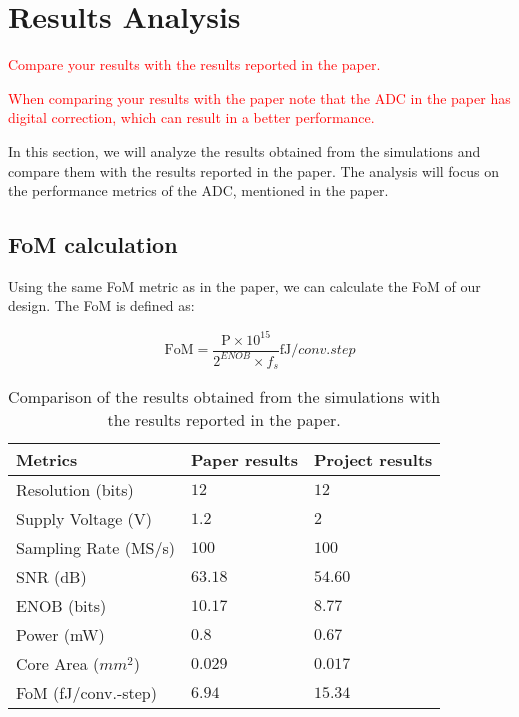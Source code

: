 \section{Results Analysis}
\label{sec:results}
\textcolor{red}{Compare your results with the results reported in the paper.}

\textcolor{red}{When comparing your results with the paper note that the ADC in the paper has digital correction, which can result in a better performance.}

In this section, we will analyze the results obtained from the simulations and compare them with the results reported in the paper. The analysis will focus on the performance metrics of the ADC, mentioned in the paper.

\subsection{FoM calculation}

Using the same FoM metric as in the paper, we can calculate the FoM of our design. The FoM is defined as:

\begin{equation}
    \text{FoM} = \frac{\text{P} \times 10^{15}}{2^{ENOB} \times f_s } \si{\femto \joule \per conv.step}
    \label{eq:FoM}
\end{equation}

\begin{table}[h]
    \centering
    \caption{Comparison of the results obtained from the simulations with the results reported in the paper.}
    \begin{tabularx}{\textwidth}{>{\centering\arraybackslash}X >{\centering\arraybackslash}X >{\centering\arraybackslash}X }
        \toprule
        \textbf{Metrics} & \textbf{Paper results} & \textbf{Project results}\\
        \midrule
        Resolution (bits) & $12$ & $12$ \\
        \midrule
        Supply Voltage (V) & $1.2$ & $2$ \\
        \midrule
        Sampling Rate (MS/s) & $100$ & $100$  \\
        \midrule
        SNR (dB) & $63.18$ & $54.60$ \\
        \midrule
        ENOB (bits) & $10.17$ & $8.77$ \\
        \midrule
        Power (mW) & $0.8$ & $0.67$   \\
        \midrule
        Core Area ($mm^2$) & $0.029$ & $0.017$   \\
        \midrule
        FoM (fJ/conv.-step) & $6.94$ & $15.34$  \\
        \bottomrule
    \end{tabularx}
    \label{tab:comparison_results}
\end{table}

